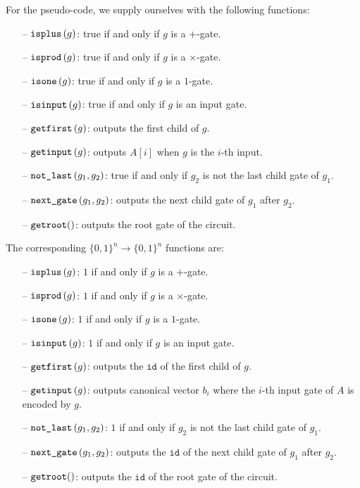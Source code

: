For the pseudo-code, we supply ourselves with the following functions:

\begin{itemize}
	\item[--] $\texttt{isplus}\left( g \right)$: true if and only if $g$ is a $+$-gate.
	\item[--] $\texttt{isprod}\left(g \right)$: true if and only if $g$ is a $\times$-gate.
	\item[--] $\texttt{isone}\left(g \right)$: true if and only if $g$ is a $1$-gate.
	\item[--] $\texttt{isinput}\left(g \right)$: true if and only if $g$ is an input gate.
	\item[--] $\texttt{getfirst}\left(g \right)$: outputs the first child of $g$.
	\item[--] $\texttt{getinput}\left(g \right)$: outputs $A[i]$ when $g$ is the $i$-th input.
	\item[--] $\texttt{not{\_}last}\left(g_1,g_2 \right)$: true if and only if $g_2$ is not the last child gate of $g_1$.
	\item[--] $\texttt{next{\_}gate}\left(g_1, g_2 \right)$: outputs the next child gate of $g_1$ after $g_2$.
	\item[--] $\texttt{getroot}()$: outputs the root gate of the circuit.
\end{itemize}

The corresponding $\lbrace 0,1 \rbrace^n\rightarrow\lbrace 0,1 \rbrace^n$ functions are:

\begin{itemize}
	\item[--] $\texttt{isplus}\left( g \right)$: $1$ if and only if $g$ is a $+$-gate.
	\item[--] $\texttt{isprod}\left(g \right)$: $1$ if and only if $g$ is a $\times$-gate.
	\item[--] $\texttt{isone}\left(g \right)$: $1$ if and only if $g$ is a $1$-gate.
	\item[--] $\texttt{isinput}\left(g \right)$: $1$ if and only if $g$ is an input gate.
	\item[--] $\texttt{getfirst}\left(g \right)$: outputs the $\texttt{id}$ of the first child of $g$.
	\item[--] $\texttt{getinput}\left(g \right)$: outputs canonical vector $b_i$ where the $i$-th input gate of $A$ is encoded by $g$.
	\item[--] $\texttt{not{\_}last}\left(g_1,g_2 \right)$: $1$ if and only if $g_2$ is not the last child gate of $g_1$.
	\item[--] $\texttt{next{\_}gate}\left(g_1, g_2 \right)$: outputs the $\texttt{id}$ of the next child gate of $g_1$ after $g_2$.
	\item[--] $\texttt{getroot}()$: outputs the $\texttt{id}$ of the root gate of the circuit.
\end{itemize}

